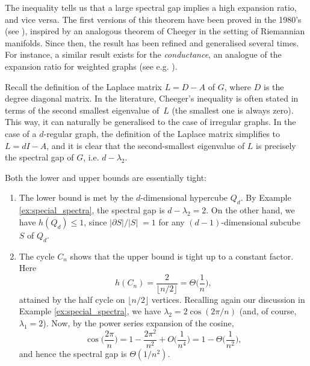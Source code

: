 The inequality tells us that a large spectral gap implies a high expansion ratio, and vice versa. 
The first versions of this theorem have been proved in the 1980's (see \cite{dodziuk, aloneigenvaluesandexpanders}), inspired by an analogous theorem of Cheeger \cite{cheeger} in the setting of Riemannian manifolds.
Since then, the result has been refined and generalised several times.
For instance, a similar result exists for the \textit{conductance}, an analogue of the expansion ratio for weighted graphs (see e.g. \cite[Chapter 21]{spielman}).

Recall the definition of the Laplace matrix $L = D - A$ of $G$, where $D$ is the degree diagonal matrix.
In the literature, Cheeger's inequality is often stated in terms of the second smallest eigenvalue \mbox{of $L$} (the smallest one is always zero).
This way, it can naturally be generalised to the case of irregular graphs.
In the case of a $d$-regular graph, the definition of the Laplace matrix simplifies to $L = dI - A$, and it is clear that the second-smallest eigenvalue of $L$ is precisely the spectral gap of $G$, i.e. \mbox{$d - \lambda_2$}.

\begin{remark}
    Both the lower and upper bounds are essentially tight:
    \begin{enumerate}
        \item The lower bound is met by the $d$-dimensional hypercube $Q_d$. 
            By Example \ref{ex:special_spectra}, the spectral gap is $d - \lambda_2 = 2$. 
            On the other hand, we have $h(Q_d) \le 1$, since $|\partial S| / |S|\; = 1$ for any $(d-1)$-dimensional subcube $S$ of $Q_d$. 

        \item The cycle $C_n$ shows that the upper bound is tight up to a constant factor.
            Here 
            \begin{equation*}
                h(C_n) = \frac{2}{\lfloor n / 2 \rfloor} = \Theta \Big (\frac{1}{n} \Big),
            \end{equation*}
            attained by the half cycle on $\lfloor n/2 \rfloor$ vertices.
            Recalling again our discussion in Example \ref{ex:special_spectra}, we have $\lambda_2 = 2 \cos ( {2 \pi}/{n})$ (and, of course, $\lambda_1 = 2$).
            Now, by the power series expansion of the cosine, 
            \begin{equation*}
                \cos \Big( \frac{2 \pi}{n} \Big) = 1 - \frac{2 \pi^2}{n^2} + O \Big( \frac{1}{n^4} \Big) = 1 - \Theta \Big( \frac{1}{n^2} \Big),
            \end{equation*}
            and hence the spectral gap is $\Theta ({1}/{n^2})$.
    \end{enumerate}
\end{remark}

